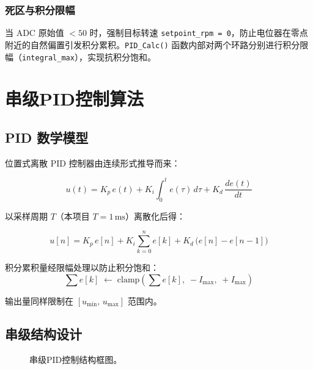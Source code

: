 \documentclass[12pt, a4paper]{ctexrep}
\begin{document}
\subsection{死区与积分限幅}

当 ADC 原始值 $< 50$ 时，强制目标转速 \texttt{setpoint\_rpm = 0}，防止电位器在零点附近的自然偏置引发积分累积。\texttt{PID\_Calc()} 函数内部对两个环路分别进行积分限幅（\texttt{integral\_max}），实现抗积分饱和。

\chapter{串级PID控制算法}

\section{PID 数学模型}

位置式离散 PID 控制器由连续形式推导而来：

\begin{equation}
    u(t) = K_p\,e(t) + K_i\int_0^t e(\tau)\,d\tau + K_d\,\frac{de(t)}{dt}
\end{equation}

以采样周期 $T$（本项目 $T = 1\,\text{ms}$）离散化后得：

\begin{equation}
    u[n] = K_p\,e[n]
         + K_i \sum_{k=0}^{n} e[k]
         + K_d\,\bigl(e[n] - e[n-1]\bigr)
    \label{eq:pid_discrete}
\end{equation}

积分累积量经限幅处理以防止积分饱和：
\begin{equation}
    \sum e[k] \;\leftarrow\; \text{clamp}\!\left(\sum e[k],\;
    -I_{\max},\; +I_{\max}\right)
\end{equation}

输出量同样限制在 $[u_{\min},\, u_{\max}]$ 范围内。

\section{串级结构设计}

\begin{figure}[H]
    \centering
    \caption{串级PID控制结构框图。}
    \label{fig:cascade}
\end{figure}
\end{document}
